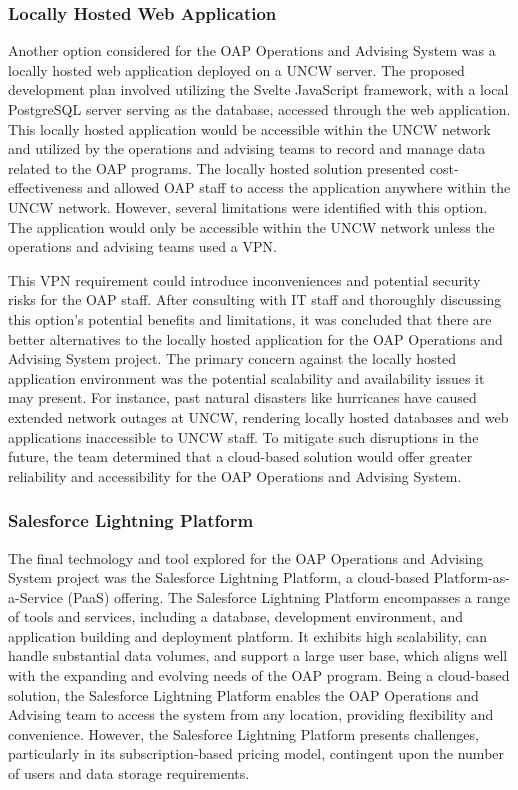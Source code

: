 \documentclass[12pt]{article}
\begin{document}
\subsubsection{Locally Hosted Web Application} 
Another option considered for the OAP Operations and Advising System was a locally hosted web application deployed on a UNCW server. The proposed development plan involved utilizing the Svelte JavaScript framework, with a local PostgreSQL server serving as the database, accessed through the web application. This locally hosted application would be accessible within the UNCW network and utilized by the operations and advising teams to record and manage data related to the OAP programs. The locally hosted solution presented cost-effectiveness and allowed OAP staff to access the application anywhere within the UNCW network. However, several limitations were identified with this option. The application would only be accessible within the UNCW network unless the operations and advising teams used a VPN.

This VPN requirement could introduce inconveniences and potential security risks for the OAP staff. After consulting with IT staff and thoroughly discussing this option's potential benefits and limitations, it was concluded that there are better alternatives to the locally hosted application for the OAP Operations and Advising System project. The primary concern against the locally hosted application environment was the potential scalability and availability issues it may present. For instance, past natural disasters like hurricanes have caused extended network outages at UNCW, rendering locally hosted databases and web applications inaccessible to UNCW staff. To mitigate such disruptions in the future, the team determined that a cloud-based solution would offer greater reliability and accessibility for the OAP Operations and Advising System.

\subsubsection{Salesforce Lightning Platform} 
The final technology and tool explored for the OAP Operations and Advising System project was the Salesforce Lightning Platform, a cloud-based Platform-as-a-Service (PaaS) offering. The Salesforce Lightning Platform encompasses a range of tools and services, including a database, development environment, and application building and deployment platform. It exhibits high scalability, can handle substantial data volumes, and support a large user base, which aligns well with the expanding and evolving needs of the OAP program. Being a cloud-based solution, the Salesforce Lightning Platform enables the OAP Operations and Advising team to access the system from any location, providing flexibility and convenience. However, the Salesforce Lightning Platform presents challenges, particularly in its subscription-based pricing model, contingent upon the number of users and data storage requirements.
\end{document}
